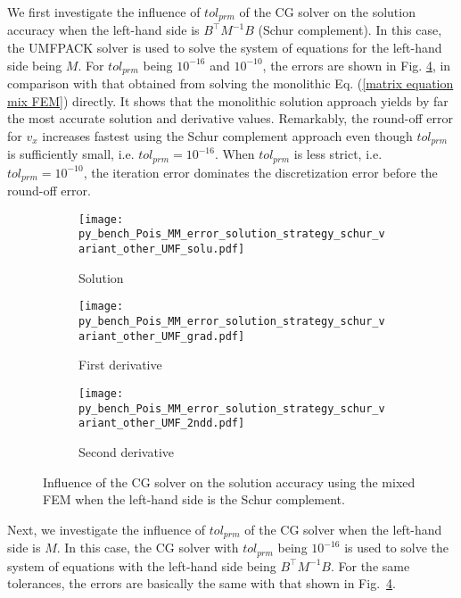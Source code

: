 \documentclass[review,3p]{elsarticle}
\begin{document}
We first investigate the influence of $tol_{prm}$ of the CG solver on the solution accuracy when the left-hand side is $B^{\top}M^{-1}B$ (Schur complement). In this case, the UMFPACK solver is used to solve the system of equations for the left-hand side being $M$.  
For $tol_{prm}$ being $10^{-16}$ and $10^{-10}$, the errors are shown in Fig. \ref{Fig:py_bench_Pois_MM_error_solution_strategy_schur_variant_other_UMF}, in comparison with that obtained from solving the monolithic Eq. (\ref{matrix equation mix FEM}) directly.
It shows that the monolithic solution approach yields by far the most accurate solution and derivative values.
Remarkably, the round-off error for $v_{x}$ increases fastest using the Schur complement approach even though $tol_{prm}$ is sufficiently small, i.e. $tol_{prm}=10^{-16}$.
When $tol_{prm}$ is less strict, i.e. $tol_{prm}=10^{-10}$, the iteration error dominates the discretization error before the round-off error.

\begin{figure}[!ht]
    \begin{subfigure}{5.5cm}
        \texttt{[image: py\_bench\_Pois\_MM\_error\_solution\_strategy\_schur\_variant\_other\_UMF\_solu.pdf]}
        \caption{Solution}
        \label{Fig:py_bench_Pois_MM_error_solution_strategy_schur_variant_other_UMF_solu}
    \end{subfigure}
    \hspace{-0.2cm}
    \begin{subfigure}{5.5cm}
        \texttt{[image: py\_bench\_Pois\_MM\_error\_solution\_strategy\_schur\_variant\_other\_UMF\_grad.pdf]}
        \caption{First derivative}
        \label{Fig:py_bench_Pois_MM_error_solution_strategy_schur_variant_other_UMF_grad}
    \end{subfigure}
    \hspace{-0.2cm}
    \begin{subfigure}{5.5cm}
        \texttt{[image: py\_bench\_Pois\_MM\_error\_solution\_strategy\_schur\_variant\_other\_UMF\_2ndd.pdf]}
        \caption{Second derivative}
        \label{Fig:py_bench_Pois_MM_error_solution_strategy_schur_variant_other_UMF_2ndd}
    \end{subfigure}
\caption{Influence of the CG solver on the solution accuracy using the mixed FEM when the left-hand side is the Schur complement.}
\label{Fig:py_bench_Pois_MM_error_solution_strategy_schur_variant_other_UMF}
\end{figure}

Next, we investigate the influence of $tol_{prm}$ of the CG solver when the left-hand side is $M$. In this case, the CG solver with $tol_{prm}$ being $10^{-16}$ is used to solve the system of equations with the left-hand side being $B^{\top}M^{-1}B$. For the same tolerances, the errors are basically the same with that shown in Fig.~\ref{Fig:py_bench_Pois_MM_error_solution_strategy_schur_variant_other_UMF}.
\end{document}
